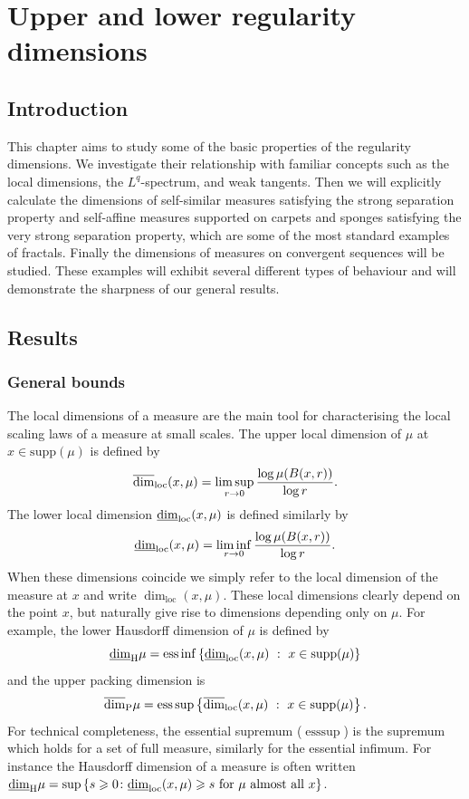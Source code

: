 \chapter{Upper and lower regularity dimensions}
\label{chap:upper_reg}


\section{Introduction}
\label{ch-upper-reg:intro-reg-dims}


This chapter aims to study some of the basic properties of the regularity dimensions. We investigate their relationship with familiar concepts such as the local dimensions, the $L^q$-spectrum, and weak tangents. Then we will explicitly calculate the dimensions of self-similar measures satisfying the strong separation property and self-affine measures supported on carpets and sponges satisfying the very strong separation property, which are some of the most standard examples of fractals. Finally the dimensions of measures on convergent sequences will be studied. These examples will exhibit several different types of behaviour and will demonstrate the sharpness of our general results. 


\section{Results}\label{ch-upper-reg:results}

\subsection{General bounds}\label{ch-upper-reg:bounds}

The local dimensions of a measure are the main tool for characterising the local scaling laws of a measure at small scales. The upper local dimension of $\mu$ at $x \in \text{supp}(\mu)$ is defined by
\[
\ulocal=\limsup_{r\rightarrow 0} \frac{\log \mu(B(x,r))}{\log r}.
\]
The lower local dimension $\llocal$ is defined similarly by
\[
\llocal=\liminf_{r\rightarrow 0} \frac{\log \mu(B(x,r))}{\log r}.
\]
When these dimensions coincide we simply refer to the local dimension of the measure at $x$ and write $\dim_{\text{loc}}(x,\mu)$. These local dimensions clearly depend on the point $x$, but naturally give rise to dimensions depending only on $\mu$. For example, the lower Hausdorff dimension of $\mu$ is defined by
\[
\underline{\dim}_\H \mu=\text{ess}  \inf \left\{  \underline{\dim}_{\text{loc}}(x,\mu)  \ : \  x\in \text{supp}(\mu) \right\} 
\]
and the upper packing dimension is
\[
\overline{\dim}_\P \mu=\text{ess}  \sup \left\{ \overline{\dim}_{\text{loc}}(x,\mu) \ : \  x\in \text{supp}(\mu) \right\}.
\]
For technical completeness, the essential supremum ($\text{ess} \sup$) is the supremum which holds for a set of full measure, similarly for the essential infimum. For instance the Hausdorff dimension of a measure is often written $\underline{\dim}_\H \mu = \sup\left\{ s \ge 0 \colon \llocal \ge s  \text{ for $\mu$ almost all }x  \right\}$. 

